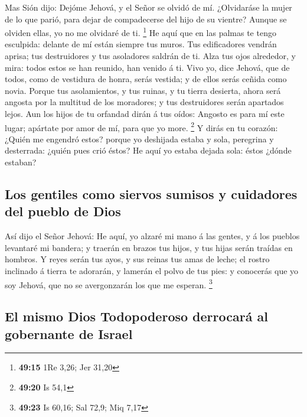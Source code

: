  Mas Sión dijo: Dejóme Jehová, y el Señor se olvidó de
mí.  ¿Olvidaráse la mujer de lo que parió, para dejar de
compadecerse del hijo de su vientre? Aunque se olviden ellas, yo no me
olvidaré de ti. \footnote{\textbf{49:15} 1Re 3,26; Jer 31,20}
 He aquí que en las palmas te tengo esculpida: delante de
mí están siempre tus muros.  Tus edificadores vendrán
aprisa; tus destruidores y tus asoladores saldrán de ti. 
Alza tus ojos alrededor, y mira: todos estos se han reunido, han venido
á ti. Vivo yo, dice Jehová, que de todos, como de vestidura de honra,
serás vestida; y de ellos serás ceñida como novia. 
Porque tus asolamientos, y tus ruinas, y tu tierra desierta, ahora será
angosta por la multitud de los moradores; y tus destruidores serán
apartados lejos.  Aun los hijos de tu orfandad dirán á
tus oídos: Angosto es para mí este lugar; apártate por amor de mí, para
que yo more. \footnote{\textbf{49:20} Is 54,1}  Y dirás
en tu corazón: ¿Quién me engendró estos? porque yo deshijada estaba y
sola, peregrina y desterrada: ¿quién pues crió éstos? He aquí yo estaba
dejada sola: éstos ¿dónde estaban?

\hypertarget{los-gentiles-como-siervos-sumisos-y-cuidadores-del-pueblo-de-dios}{%
\subsection{Los gentiles como siervos sumisos y cuidadores del pueblo de
Dios}\label{los-gentiles-como-siervos-sumisos-y-cuidadores-del-pueblo-de-dios}}

 Así dijo el Señor Jehová: He aquí, yo alzaré mi mano á
las gentes, y á los pueblos levantaré mi bandera; y traerán en brazos
tus hijos, y tus hijas serán traídas en hombros.  Y reyes
serán tus ayos, y sus reinas tus amas de leche; el rostro inclinado á
tierra te adorarán, y lamerán el polvo de tus pies: y conocerás que yo
soy Jehová, que no se avergonzarán los que me esperan. \footnote{\textbf{49:23}
  Is 60,16; Sal 72,9; Miq 7,17}

\hypertarget{el-mismo-dios-todopoderoso-derrocaruxe1-al-gobernante-de-israel}{%
\subsection{El mismo Dios Todopoderoso derrocará al gobernante de
Israel}\label{el-mismo-dios-todopoderoso-derrocaruxe1-al-gobernante-de-israel}}

